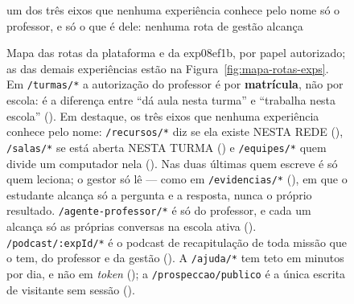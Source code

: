 \begin{figure}[H]
{\begin{tikzpicture}[x=1cm, y=1cm,
    rt/.style={c4component, text width=33mm, minimum height=16mm}]
\end{tikzpicture}}
\begin{legendadiag}
 um dos três eixos que nenhuma
experiência conhece pelo nome \quad
{} só o professor, e só o que é dele:
nenhuma rota de gestão alcança
\end{legendadiag}
\caption[Mapa de rotas da API --- plataforma e exp08ef1b]{Mapa das rotas da
  plataforma e da exp08ef1b, por papel autorizado; as das demais experiências
  estão na Figura~\ref{fig:mapa-rotas-exps}. Em \texttt{/turmas/*} a autorização
  do professor é por \textbf{matrícula}, não por escola: é a diferença entre
  \enquote{dá aula nesta turma} e \enquote{trabalha nesta escola}
  (). Em destaque, os três eixos que nenhuma experiência conhece
  pelo nome: \texttt{/recursos/*} diz se ela existe NESTA REDE (),
  \texttt{/salas/*} se está aberta NESTA TURMA () e
  \texttt{/equipes/*} quem divide um computador nela (). Nas duas
  últimas quem escreve é só quem leciona; o gestor só lê --- como em
  \texttt{/evidencias/*} (), em que o estudante alcança só a
  pergunta e a resposta, nunca o próprio resultado. \texttt{/agente-professor/*}
  é só do professor, e cada um alcança só as próprias conversas na escola ativa
  (). \texttt{/podcast/:expId/*} é o podcast de recapitulação de
  toda missão que o tem, do professor e da gestão (). A
  \texttt{/ajuda/*} tem teto em minutos por dia, e não em \emph{token}
  (); a \texttt{/prospeccao/publico} é a única escrita de
  visitante sem sessão ().}
\label{fig:mapa-rotas}
\end{figure}

\newpage

